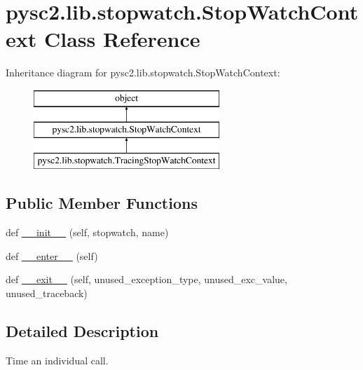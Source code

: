 \hypertarget{classpysc2_1_1lib_1_1stopwatch_1_1_stop_watch_context}{}\section{pysc2.\+lib.\+stopwatch.\+Stop\+Watch\+Context Class Reference}
\label{classpysc2_1_1lib_1_1stopwatch_1_1_stop_watch_context}
Inheritance diagram for pysc2.\+lib.\+stopwatch.\+Stop\+Watch\+Context\+:\begin{figure}[H]
\begin{center}
\leavevmode
\includegraphics[height=3.000000cm]{classpysc2_1_1lib_1_1stopwatch_1_1_stop_watch_context}
\end{center}
\end{figure}
\subsection*{Public Member Functions}
\begin{DoxyCompactItemize}
\item 
def \mbox{\hyperlink{classpysc2_1_1lib_1_1stopwatch_1_1_stop_watch_context_abff3f9b53287c986522e7b1c8fca4730}{\+\_\+\+\_\+init\+\_\+\+\_\+}} (self, stopwatch, name)
\item 
def \mbox{\hyperlink{classpysc2_1_1lib_1_1stopwatch_1_1_stop_watch_context_a07730e846dba3f098f3f142a73a05673}{\+\_\+\+\_\+enter\+\_\+\+\_\+}} (self)
\item 
def \mbox{\hyperlink{classpysc2_1_1lib_1_1stopwatch_1_1_stop_watch_context_ac60f1449ee817c0fccf36816828f5c5b}{\+\_\+\+\_\+exit\+\_\+\+\_\+}} (self, unused\+\_\+exception\+\_\+type, unused\+\_\+exc\+\_\+value, unused\+\_\+traceback)
\end{DoxyCompactItemize}


\subsection{Detailed Description}
\begin{DoxyVerb}Time an individual call.\end{DoxyVerb}
 

